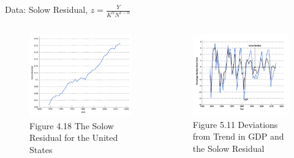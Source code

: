 \documentclass[11pt,aspectratio=169,usenames,dvipsnames]{beamer}
\begin{document}
\begin{frame}{Data: Solow Residual, $ z = \frac{Y}{K^{\alpha} N^{1-\alpha}} $}
\label{slide:Data__Solow_Residual____z____frac_Y__K___alpha__N__1__alpha____}
    \begin{columns}
        \begin{column}{0.5\textwidth}
            \begin{figure}
                \caption{\scriptsize Figure 4.18  The Solow Residual for the United States}
                \includegraphics[width=\textwidth]{./figures/Figure4_18.jpg}
            \end{figure}
        \end{column}
        \begin{column}{0.5\textwidth}
            \begin{figure}
                \caption{\scriptsize Figure 5.11  Deviations from Trend in GDP and the Solow Residual}
                \includegraphics[width=\textwidth]{./figures/Figure5_11.jpg}
            \end{figure}
        \end{column}
    \end{columns}
\end{frame}
\end{document}
